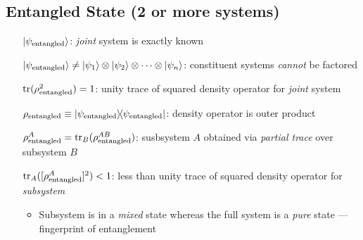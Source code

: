 \subsection*{Entangled State (2 or more systems)}
\begin{itemize}
\item [$\ket{\psi_{\text{entangled}}}$:] \emph{joint} system is exactly
  known
\item [$\ket{\psi_{\text{entangled}}} \neq \ket{\psi_1}\otimes\ket{\psi_2}\otimes
  \dotsm \otimes \ket{\psi_n}$:] constituent systems \emph{cannot} be factored 
\item [$\trace(\rho_{\text{entangled}}^2) = 1$:] unity trace of squared
  density operator for \emph{joint} system
\item [$\rho_{\text{entangled}} \equiv
  \outerproduct{\psi_{\text{entangled}}}$:] density operator is outer
  product
\item [$\rho_{\text{entangled}}^A = \trace_B(\rho_{\text{entangled}}^{AB})$:]
      susbsystem $A$ obtained via \emph{partial trace} over subsystem $B$
\item [$\trace_A([{\rho_{\text{entangled}}^A]^2}) < 1$:] less than unity trace of
  squared density operator for \emph{subsystem}
  \begin{itemize}
  \item Subsystem is in a \emph{mixed} state whereas the full system is a
    \emph{pure} state --- fingerprint of entanglement
  \end{itemize}


\end{itemize}


